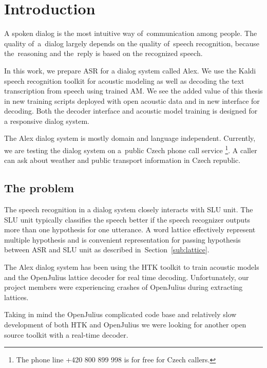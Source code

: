 \chapter{Introduction}
\label{chap:intro}

A spoken dialog is the most intuitive way of~communication among people. 
The quality of~a~dialog largely depends on the quality 
of~speech recognition, because the~reasoning and the~reply is based on the recognized speech. 

In this work, we prepare \acl{ASR} for a dialog system called Alex. 
We use the Kaldi\cite{povey2011kaldi} speech recognition toolkit for acoustic modeling 
as well as decoding the text transcription from speech using trained \acl{AM}.
We see the added value of this thesis in new training scripts deployed with open acoustic data\cite{korvas_2014}
and in new interface for decoding. Both the decoder interface and acoustic model training is designed 
for a responsive dialog system. 

The Alex dialog system is mostly domain and language independent.
Currently, we are testing the dialog system on a~public Czech phone call service
\footnote{The phone line +420 800 899 998 is for free for Czech callers.}.
A caller can ask about weather and public transport information in Czech republic.

\section{The problem} 
\label{sec:problem}

The speech recognition in a dialog system closely interacts with \acl{SLU} unit.
The \ac{SLU} unit typically classifies the speech better 
if the speech recognizer outputs more than one hypothesis for one utterance. 
A word lattice effectively represent multiple hypothesis and is convenient
representation for passing hypothesis between \ac{ASR} and \ac{SLU} unit 
as described in~Section~\ref{sub:lattice}.

The Alex dialog system has been using the \ac{HTK} toolkit\cite{young94htk} 
to train acoustic models and 
the OpenJulius\cite{lee2009julius} lattice decoder for real time decoding. 
Unfortunately, our project members were experiencing crashes 
of OpenJulius during extracting lattices.

Taking in mind the OpenJulius complicated code base and relatively slow
development of both \ac{HTK} and OpenJulius we were looking 
for another open source toolkit with a real-time decoder.

